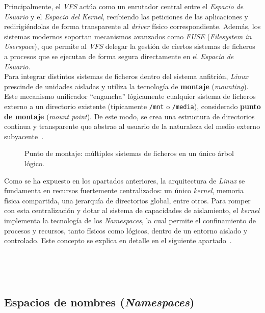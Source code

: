 Principalmente, el \textit{VFS} actúa como un enrutador central entre el \textit{Espacio de Usuario} y el \textit{Espacio del Kernel}, recibiendo las peticiones de las aplicaciones y redirigiéndolas de forma transparente al \textit{driver} físico correspondiente.
Además, los sistemas modernos soportan mecanismos avanzados como \textit{FUSE} (\textit{Filesystem in Userspace}), que permite al \textit{VFS} delegar la gestión de ciertos sistemas de ficheros a procesos que se ejecutan de forma segura directamente en el \textit{Espacio de Usuario}.\\

Para integrar distintos sistemas de ficheros dentro del sistema anfitrión, \textit{Linux} prescinde de unidades aisladas y utiliza la tecnología de \textbf{montaje} (\textit{mounting}).
Este mecanismo unificador ``engancha'' lógicamente cualquier sistema de ficheros externo a un directorio existente (típicamente \texttt{/mnt} o \texttt{/media}), considerado \textbf{punto de montaje} (\textit{mount point}).
De este modo, se crea una estructura de directorios continua y transparente que abstrae al usuario de la naturaleza del medio externo subyacente~\cite{love_linux}.\\

\begin{figure}[h!]
  \centering
  \scalebox{0.8}{}
  \caption{Punto de montaje: múltiples sistemas de ficheros en un único árbol lógico.}
  \label{fig:mounting_point}
\end{figure}

Como se ha expuesto en los apartados anteriores, la arquitectura de \textit{Linux} se fundamenta en recursos fuertemente centralizados: un único \textit{kernel}, memoria física compartida, una jerarquía de directorios global, entre otros.
Para romper con esta centralización y dotar al sistema de capacidades de aislamiento, el \textit{kernel} implementa la tecnología de los \textit{Namespaces}, la cual permite el confinamiento de procesos y recursos, tanto físicos como lógicos, dentro de un entorno aislado y controlado.
Este concepto se explica en detalle en el siguiente apartado~\cite{librossoo, love_linux}.

\

\

\subsection{Espacios de nombres (\textit{Namespaces})}
\label{sec:namespaces}

